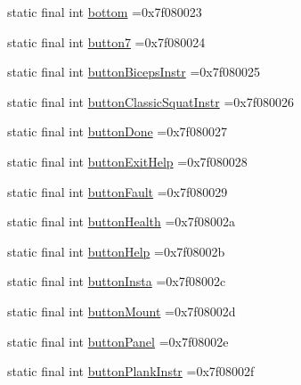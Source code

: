 \begin{DoxyCompactItemize}
static final int \mbox{\hyperlink{classcom_1_1example_1_1trainawearapplication_1_1_r_1_1id_aba9da52b1f6229f419bc79d87de9bb17}{bottom}} =0x7f080023
\item 
static final int \mbox{\hyperlink{classcom_1_1example_1_1trainawearapplication_1_1_r_1_1id_a534348502a5c9b09421016e9e062c5ec}{button7}} =0x7f080024
\item 
static final int \mbox{\hyperlink{classcom_1_1example_1_1trainawearapplication_1_1_r_1_1id_a9a1b7a515a859161b03db02ce7e549b0}{button\+Biceps\+Instr}} =0x7f080025
\item 
static final int \mbox{\hyperlink{classcom_1_1example_1_1trainawearapplication_1_1_r_1_1id_ae6b96190ec546ce73527110d9a7fe12e}{button\+Classic\+Squat\+Instr}} =0x7f080026
\item 
static final int \mbox{\hyperlink{classcom_1_1example_1_1trainawearapplication_1_1_r_1_1id_add45d60fd49efbedb579b5e51d50fa4f}{button\+Done}} =0x7f080027
\item 
static final int \mbox{\hyperlink{classcom_1_1example_1_1trainawearapplication_1_1_r_1_1id_a31edb6c04f8d4e212e97edfc50093f3c}{button\+Exit\+Help}} =0x7f080028
\item 
static final int \mbox{\hyperlink{classcom_1_1example_1_1trainawearapplication_1_1_r_1_1id_aa8ba71986b6d76f36594480f4813f131}{button\+Fault}} =0x7f080029
\item 
static final int \mbox{\hyperlink{classcom_1_1example_1_1trainawearapplication_1_1_r_1_1id_aee1ade8a096bb94ddaa260e94ff83983}{button\+Health}} =0x7f08002a
\item 
static final int \mbox{\hyperlink{classcom_1_1example_1_1trainawearapplication_1_1_r_1_1id_ac19404c64cdc6e2310d8873930fa2794}{button\+Help}} =0x7f08002b
\item 
static final int \mbox{\hyperlink{classcom_1_1example_1_1trainawearapplication_1_1_r_1_1id_a4b4c902dc62e1494e0132cdb275a7639}{button\+Insta}} =0x7f08002c
\item 
static final int \mbox{\hyperlink{classcom_1_1example_1_1trainawearapplication_1_1_r_1_1id_a6c4fdd6156c22bda2b7d1a23a3d34060}{button\+Mount}} =0x7f08002d
\item 
static final int \mbox{\hyperlink{classcom_1_1example_1_1trainawearapplication_1_1_r_1_1id_a5f007760c048e8be4b3d70247b0b0433}{button\+Panel}} =0x7f08002e
\item 
static final int \mbox{\hyperlink{classcom_1_1example_1_1trainawearapplication_1_1_r_1_1id_a46a058cc666090f91ed84172910c915d}{button\+Plank\+Instr}} =0x7f08002f
\item 

\end{DoxyCompactItemize}
